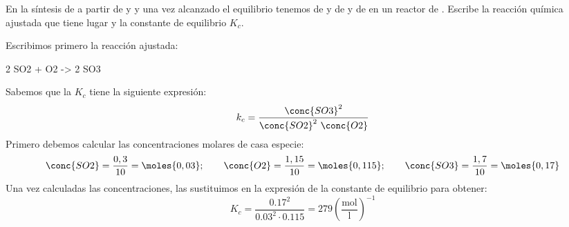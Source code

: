     \begin{example}
        En la síntesis de  a partir de  y  y una vez alcanzado el equilibrio tenemos  de  y  de  y   de  en un reactor de .
        Escribe la reacción química ajustada que tiene lugar y la constante de equilibrio \( K_c \).

        Escribimos primero la reacción ajustada:
        \begin{reaction*}
           2 SO2 \gas{} + O2 \gas{} -> 2 SO3 \gas{}
        \end{reaction*}
        Sabemos que la \( K_c \) tiene la siguiente expresión:
        \begin{equation*}
            k_c = \dfrac{\conc{SO3}^2}{\conc{SO2}^2\ \conc{O2}}
        \end{equation*}
        Primero debemos calcular las concentraciones molares de casa especie:
        \begin{equation*}
            \conc{SO2} = \dfrac{0,3}{10} = \moles{0,03}; \qquad \conc{O2} = \dfrac{1,15}{10} = \moles{0,115};\qquad \conc{SO3} = \dfrac{1,7}{10} = \moles{0,17}
        \end{equation*}
        Una vez calculadas las concentraciones, las sustituimos en la expresión de la constante de equilibrio para obtener:
        \begin{equation*}
            K_c = \dfrac{0.17^2}{0.03^2\cdot 0.115} = 279 \left( \dfrac{\si{\mole}}{\si{\litre}}\right)^{-1}
        \end{equation*}
    \end{example}

